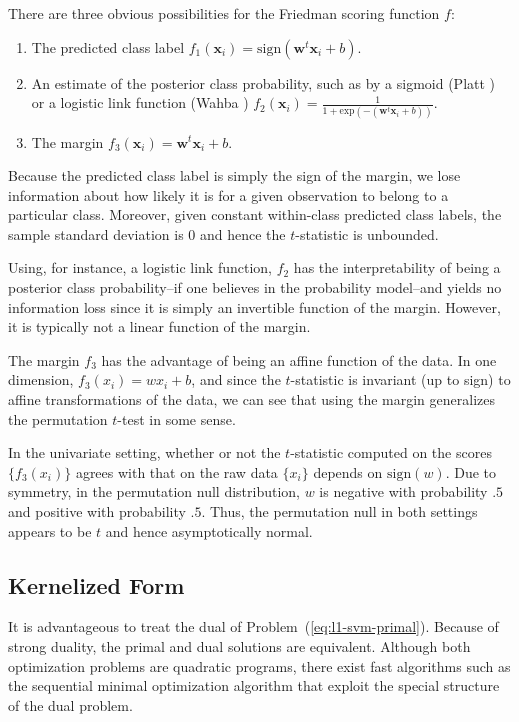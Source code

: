 There are three obvious possibilities for the Friedman scoring
function $f$:
\begin{enumerate}
\item The predicted class label $f_1(\mathbf{x}_i)
= \text{sign}(\mathbf{w}^t \mathbf{x}_i + b)$.
\item An estimate of the posterior class probability, such as by a
sigmoid (Platt \cite{platt1999probabilistic, lin2007note}) or a
logistic link function (Wahba \cite{wahba1992multivariate,
wahba1999support})
$f_2(\mathbf{x}_i) = \frac{1}{1 + \text{exp}(-(\mathbf{w}^t \mathbf{x}_i + b))}$.
\item The margin $f_3(\mathbf{x}_i) = \mathbf{w}^t \mathbf{x}_i + b$.
\end{enumerate}

Because the predicted class label is simply the sign of the margin, we
lose information about how likely it is for a given observation
to belong to a particular class.  Moreover, given constant within-class
predicted class labels, the sample standard deviation is $0$ and hence
the $t$-statistic is unbounded.

Using, for instance, a logistic link function, $f_2$ has the
interpretability of being a posterior class probability--if one
believes in the probability model--and yields no information loss
since it is simply an invertible function of the margin.  However,
it is typically not a linear function of the margin.

The margin $f_3$ has the advantage of being an affine function of the
data.  In one dimension, $f_3(x_i) = w x_i + b$, and since the
$t$-statistic is invariant (up to sign) to affine transformations of
the data, we can see that using the margin generalizes the permutation
$t$-test in some sense.

In the univariate setting, whether or not the $t$-statistic computed
on the scores $\{f_3(x_i)\}$ agrees with that on the raw data
$\{x_i\}$ depends on $\text{sign}(w)$.  Due to symmetry, in the
permutation null distribution, $w$ is negative with probability $.5$
and positive with probability $.5$.  Thus, the permutation null in
both settings appears to be $t$ and hence asymptotically normal.

\subsection{Kernelized Form}
It is advantageous to treat the dual \cite{boyd2004convex} of
Problem~(\ref{eq:l1-svm-primal}).  Because of strong duality,
the primal and dual solutions are equivalent.
Although both optimization problems
are quadratic programs, there exist fast algorithms such as the
sequential minimal optimization algorithm \cite{platt199912} that
exploit the special structure of the dual problem.

